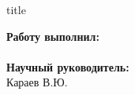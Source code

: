 \begin{frame}[plain]
	
	\begin{center}
		\small{\insertinstitute}
		\vspace{1cm}
	\end{center}
		\begin{beamercolorbox}[sep=8pt,center]{title}
			\inserttitle
		\end{beamercolorbox}
		\vspace{0.1cm}
	\begin{flushright}
		\normalsize \textbf{Работу выполнил:}\\
		\large
		\insertauthor \\
		\vspace{0.5cm}
		\normalsize{\textbf{Научный руководитель:}\\}
		\large{Караев В.Ю.}
		\vfill
	\end{flushright}

	\centering{\small{\today }}
\end{frame}
